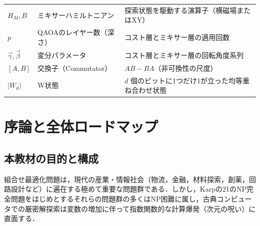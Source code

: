 \documentclass[11pt,a4paper,oneside,openany]{ltjsbook}
\theoremstyle{definition}
\theoremstyle{plain}
\theoremstyle{remark}
\newcommand{\ket}[1]{|#1\rangle}
\begin{document}
\begin{table}[htbp]
\begin{tabularx}{\textwidth}{l p{5cm} X}
$H_M, B$ & ミキサーハミルトニアン & 探索状態を駆動する演算子（横磁場またはXY） \\
$p$ & QAOAのレイヤー数（深さ） & コスト層とミキサー層の適用回数 \\
$\vec{\gamma}, \vec{\beta}$ & 変分パラメータ & コスト層とミキサー層の回転角度系列 \\
$[A, B]$ & 交換子（Commutator） & $AB - BA$（非可換性の尺度） \\
$\ket{W_d}$ & W状態 & $d$ 個のビットに1つだけ1が立った均等重ね合わせ状態 \\
\bottomrule
\end{tabularx}
\end{table}

\newpage

\tableofcontents

\mainmatter

\chapter{序論と全体ロードマップ}

\section{本教材の目的と構成}
組合せ最適化問題は，現代の産業・情報社会（物流，金融，材料探索，創薬，回路設計など）に遍在する極めて重要な問題群である．しかし，Karpの21のNP完全問題をはじめとするそれらの問題群の多くはNP困難に属し，古典コンピュータでの厳密解探索は変数の増加に伴って指数関数的な計算爆発（次元の呪い）に直面する\cite{lucas2014ising}．
\end{document}
